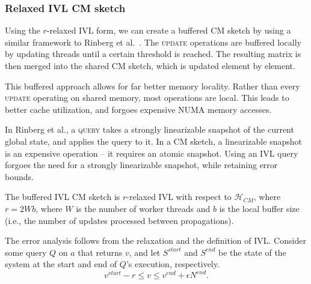 
\subsubsection{Relaxed IVL CM sketch}
\label{ivl-sssec:relaxed-cm}

Using the $r$-relaxed IVL form, we can create a buffered CM sketch
by using a similar framework to Rinberg et al.~\cite{rinberg2019fast}. The
\textsc{update} operations are buffered locally by updating threads until a certain threshold
is reached. The resulting matrix is then merged into the shared CM sketch,
which is updated element by element. 

This buffered approach allows for far better memory locality. Rather than every
\textsc{update} operating on shared memory, most operations are local. This
leads to better cache utilization, and forgoes expensive NUMA memory accesses.

In Rinberg et al., a \textsc{query} takes a strongly linearizable snapshot of the
current global state, and applies the query
to it.  In a CM sketch, a linearizable snapshot is an expensive operation -- it requires
an atomic snapshot. Using an IVL query
forgoes the need for a strongly linearizable snapshot, while retaining error bounds.

The buffered IVL CM sketch is $r$-relaxed IVL with respect to $\mathcal{H}_{CM}$, where
$r=2Wb$, where $W$ is the number of worker threads and $b$ is the local buffer size (i.e.,
the number of updates processed between propagations).

The error analysis follows from the relaxation and the definition of IVL. Consider some query $Q$ on $a$
that returns $v$, and let $S^{start}$ and $S^{end}$ be the state of the system at the start and end of
$Q$'s execution, respectively.
\[ v^{start} - r \leq v \leq  v^{end} + \epsilon N^{end}. \]